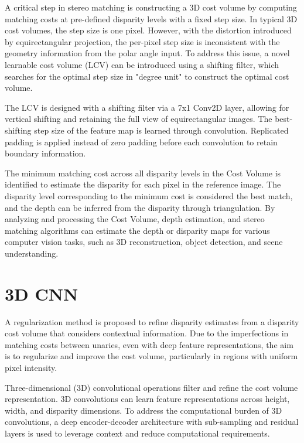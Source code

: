 \documentclass[english, LaM, oneside]{sapthesis}%
\begin{document}
A critical step in stereo matching is constructing a 3D cost volume by computing matching costs at pre-defined disparity levels with a fixed step size. In typical 3D cost volumes, the step size is one pixel. However, with the distortion introduced by equirectangular projection, the per-pixel step size is inconsistent with the geometry information from the polar angle input. To address this issue, a novel learnable cost volume (LCV) can be introduced using a shifting filter, which searches for the optimal step size in "degree unit" to construct the optimal cost volume.

The LCV \cite{c20}is designed with a shifting filter via a 7x1 Conv2D layer, allowing for vertical shifting and retaining the full view of equirectangular images. The best-shifting step size of the feature map is learned through convolution. Replicated padding is applied instead of zero padding before each convolution to retain boundary information.

The minimum matching cost across all disparity levels in the Cost Volume is identified to estimate the disparity for each pixel in the reference image. The disparity level corresponding to the minimum cost is considered the best match, and the depth can be inferred from the disparity through triangulation. By analyzing and processing the Cost Volume, depth estimation, and stereo matching algorithms can estimate the depth or disparity maps for various computer vision tasks, such as 3D reconstruction, object detection, and scene understanding.

\section{3D CNN}
A regularization method is proposed to refine disparity estimates from a disparity cost volume that considers contextual information. Due to the imperfections in matching costs between unaries, even with deep feature representations, the aim is to regularize and improve the cost volume, particularly in regions with uniform pixel intensity.

Three-dimensional (3D) convolutional operations filter and refine the cost volume representation. 3D convolutions can learn feature representations across height, width, and disparity dimensions. To address the computational burden of 3D convolutions, a deep encoder-decoder architecture with sub-sampling and residual layers is used to leverage context and reduce computational requirements.
\end{document}
